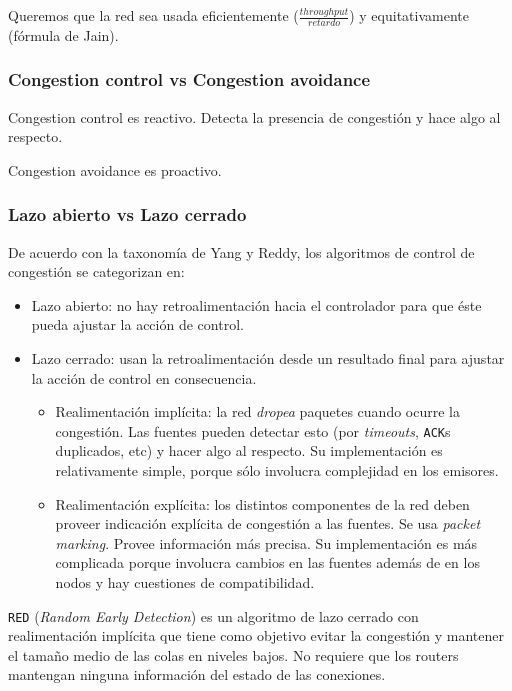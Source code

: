 \documentclass[]{article}
\begin{document}
Queremos que la red sea usada eficientemente ($\displaystyle \frac{throughput}{retardo}$) y equitativamente (fórmula de Jain).

\subsubsection{Congestion control vs Congestion avoidance}
Congestion control es reactivo. Detecta la presencia de congestión y hace algo al respecto.

Congestion avoidance es proactivo.


\subsubsection{Lazo abierto vs Lazo cerrado}
De acuerdo con la taxonomía de Yang y Reddy, los algoritmos de control de congestión se categorizan en:
\begin{itemize}
    \item Lazo abierto: no hay retroalimentación hacia el controlador para que éste pueda ajustar la acción de control.
    \item Lazo cerrado: usan la retroalimentación desde un resultado final para ajustar la acción de control en consecuencia.
    \begin{itemize}
        \item Realimentación implícita: la red \emph{dropea} paquetes cuando ocurre la congestión. Las fuentes pueden detectar esto (por \emph{timeouts}, \texttt{ACK}s duplicados, etc) y hacer algo al respecto.
        Su implementación es relativamente simple, porque sólo involucra complejidad en los emisores.
        \item Realimentación explícita: los distintos componentes de la red deben proveer indicación explícita de congestión a las fuentes. Se usa \emph{packet marking}. Provee información más precisa.
        Su implementación es más complicada porque involucra cambios en las fuentes además de en los nodos y hay cuestiones de compatibilidad.
    \end{itemize}
\end{itemize}

\texttt{RED} (\emph{Random Early Detection}) es un algoritmo de lazo cerrado con realimentación implícita que tiene como objetivo evitar la congestión y mantener el tamaño medio de las colas en niveles bajos. No requiere que los routers mantengan ninguna información del estado de las conexiones.
\end{document}
